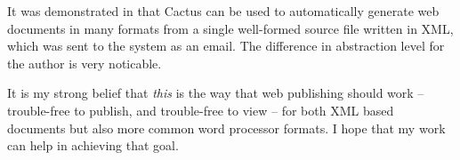 It was demonstrated in  that Cactus can be
used to automatically generate web documents in many formats from a
single well-formed source file written in XML, which was sent to the
system as an email.   The difference in abstraction level for the
author is very noticable.

It is my strong belief that \textit{this} is the way that web
publishing should work -- trouble-free to publish, and trouble-free to
view -- for both XML based documents but also more common word
processor formats.  I hope that my work can help in achieving that
goal.











